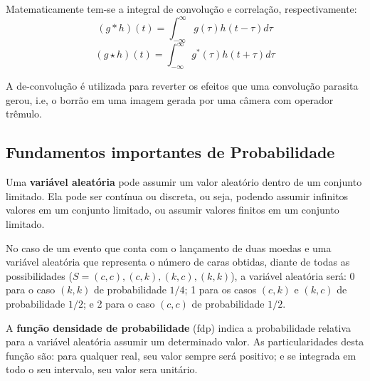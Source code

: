 Matematicamente tem-se a integral de convolução e correlação, respectivamente:
\begin{equation}
    (g \ast h)(t) = \int_{-\infty}^{\infty} g(\tau)h(t-\tau) d\tau
\end{equation}
\begin{equation}
    (g \star h)(t) = \int_{-\infty}^{\infty} g^*(\tau)h(t+\tau) d\tau
\end{equation}

A de-convolução é utilizada para reverter os efeitos que uma convolução parasita gerou, i.e, o borrão em uma imagem gerada por uma câmera com operador trêmulo. \cite{ref6}

\subsection*{Fundamentos importantes de Probabilidade \cite{ref7}}

Uma \textbf{variável aleatória} pode assumir um valor aleatório dentro de um conjunto limitado. Ela pode ser contínua ou discreta, ou seja, podendo assumir infinitos valores em um conjunto limitado, ou assumir valores finitos em um conjunto limitado. 

No caso de um evento que conta com o lançamento de duas moedas e uma variável aleatória que representa o número de caras obtidas, diante de todas as possibilidades ($S = {(c,c), (c,k), (k,c), (k,k)}$), a variável aleatória será: 0 para o caso $(k,k)$ de probabilidade $1/4$; 1 para os casos $(c,k)$ e $(k,c)$ de probabilidade $1/2$; e 2 para o caso $(c,c)$ de probabilidade $1/2$.

A \textbf{função densidade de probabilidade} (fdp) indica a probabilidade relativa para a variável aleatória assumir um determinado valor. As particularidades desta função são: para qualquer real, seu valor sempre será positivo; e se integrada em todo o seu intervalo, seu valor sera unitário.

